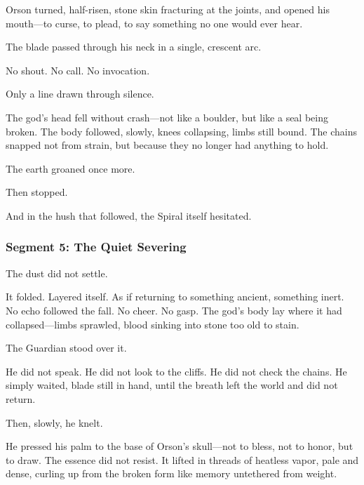 \documentclass[9pt]{article}
\begin{document}
\vspace{0.5em}
Orson turned, half-risen, stone skin fracturing at the joints, and opened his mouth---to curse, to plead, to say something no one would ever hear.

\vspace{0.5em}
The blade passed through his neck in a single, crescent arc.

\vspace{0.5em}
No shout. No call. No invocation.

\vspace{0.5em}
Only a line drawn through silence.

\vspace{0.5em}
The god’s head fell without crash---not like a boulder, but like a seal being broken. The body followed, slowly, knees collapsing, limbs still bound. The chains snapped not from strain, but because they no longer had anything to hold.

\vspace{0.5em}
The earth groaned once more.

\vspace{0.5em}
Then stopped.

\vspace{0.5em}
And in the hush that followed, the Spiral itself hesitated.


\newpage

\subsubsection*{Segment 5: The Quiet Severing}

The dust did not settle.

\vspace{0.5em}
It folded. Layered itself. As if returning to something ancient, something inert. No echo followed the fall. No cheer. No gasp. The god’s body lay where it had collapsed---limbs sprawled, blood sinking into stone too old to stain.

\vspace{0.5em}
The Guardian stood over it.

\vspace{0.5em}
He did not speak. He did not look to the cliffs. He did not check the chains. He simply waited, blade still in hand, until the breath left the world and did not return.

\vspace{0.5em}
Then, slowly, he knelt.

\vspace{0.5em}
He pressed his palm to the base of Orson’s skull---not to bless, not to honor, but to draw. The essence did not resist. It lifted in threads of heatless vapor, pale and dense, curling up from the broken form like memory untethered from weight.
\end{document}
